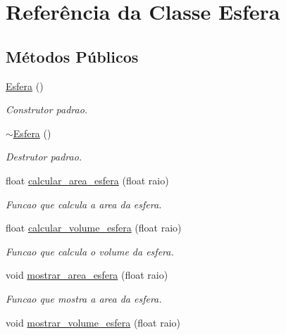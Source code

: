 \hypertarget{classEsfera}{}\section{Referência da Classe Esfera}
\label{classEsfera}
\subsection*{Métodos Públicos}
\begin{DoxyCompactItemize}
\item 
\mbox{\label{classEsfera_acd7e6a034c7a9a19b1caccebc70e6538}} 
\hyperlink{classEsfera_acd7e6a034c7a9a19b1caccebc70e6538}{Esfera} ()
\begin{DoxyCompactList}\small\item\em Construtor padrao. \end{DoxyCompactList}\item 
\mbox{\label{classEsfera_abf33ddbf68a9d97d90ddb1ee83d5c994}} 
\hyperlink{classEsfera_abf33ddbf68a9d97d90ddb1ee83d5c994}{$\sim$\+Esfera} ()
\begin{DoxyCompactList}\small\item\em Destrutor padrao. \end{DoxyCompactList}\item 
float \hyperlink{classEsfera_a3ad3c00d8c7dd3976356b7fce4c4963f}{calcular\+\_\+area\+\_\+esfera} (float raio)
\begin{DoxyCompactList}\small\item\em Funcao que calcula a area da esfera. \end{DoxyCompactList}\item 
float \hyperlink{classEsfera_afd9e4a6bf90e79bc73831c6fcbfc87b1}{calcular\+\_\+volume\+\_\+esfera} (float raio)
\begin{DoxyCompactList}\small\item\em Funcao que calcula o volume da esfera. \end{DoxyCompactList}\item 
void \hyperlink{classEsfera_a945ea5a121346cf305ee1e7a04d47b57}{mostrar\+\_\+area\+\_\+esfera} (float raio)
\begin{DoxyCompactList}\small\item\em Funcao que mostra a area da esfera. \end{DoxyCompactList}\item 
void \hyperlink{classEsfera_a8cc5291f2278d1664a75650ee6889f02}{mostrar\+\_\+volume\+\_\+esfera} (float raio)

\end{DoxyCompactItemize}

